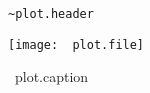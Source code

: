 \begin{figure}[H]
\begin{plotbox}
\begin{Verbatim}[formatcom=\color{darkblue}]
~plot.header
\end{Verbatim}
\end{plotbox}
\begin{mdframed}[skipabove=0pt, topline=false]
\begin{center}
\texttt{[image: ~plot.file]}
\caption{~plot.caption}
\label{~plot.label}
\end{center}
\end{mdframed}
\end{figure}
